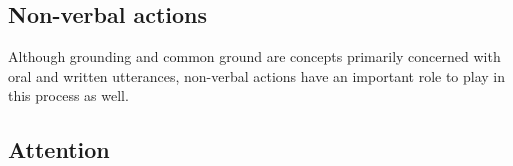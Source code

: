 






\subsection{Non-verbal actions}

Although grounding and common ground are concepts primarily concerned with oral and written utterances, non-verbal actions have an important role to play in this process as well. 







\subsection{Attention}

